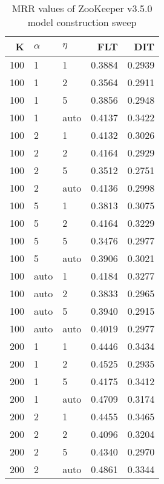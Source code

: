 
\begin{table}
\begin{spacing}{1.2}
\centering
\caption{MRR values of ZooKeeper v3.5.0 model construction sweep}
\label{table:zookeeper_model_sweep}
\vspace{0.2em}
\parbox{.45\linewidth}{\centering \begin{tabular}{rll|rr}
\toprule
   K & $\alpha$ &   $\eta$ & FLT & DIT \\
\midrule
 100 &     1 &     1 &           0.3884 & 0.2939 \\
 100 &     1 &     2 &           0.3564 & 0.2911 \\
 100 &     1 &     5 &           0.3856 & 0.2948 \\
 100 &     1 &  auto &           0.4137 & 0.3422 \\
 100 &     2 &     1 &           0.4132 & 0.3026 \\
 100 &     2 &     2 &           0.4164 & 0.2929 \\
 100 &     2 &     5 &           0.3512 & 0.2751 \\
 100 &     2 &  auto &           0.4136 & 0.2998 \\
 100 &     5 &     1 &           0.3813 & 0.3075 \\
 100 &     5 &     2 &           0.4164 & 0.3229 \\
 100 &     5 &     5 &           0.3476 & 0.2977 \\
 100 &     5 &  auto &           0.3906 & 0.3021 \\
 100 &  auto &     1 &           0.4184 & 0.3277 \\
 100 &  auto &     2 &           0.3833 & 0.2965 \\
 100 &  auto &     5 &           0.3940 & 0.2915 \\
 100 &  auto &  auto &           0.4019 & 0.2977 \\
 200 &     1 &     1 &           0.4446 & 0.3434 \\
 200 &     1 &     2 &           0.4525 & 0.2935 \\
 200 &     1 &     5 &           0.4175 & 0.3412 \\
 200 &     1 &  auto &           0.4709 & 0.3174 \\
 200 &     2 &     1 &           0.4455 & 0.3465 \\
 200 &     2 &     2 &           0.4096 & 0.3204 \\
 200 &     2 &     5 &           0.4340 & 0.2970 \\
 200 &     2 &  auto &           0.4861 & 0.3344 \\

\end{tabular}}
\end{spacing}
\end{table}
